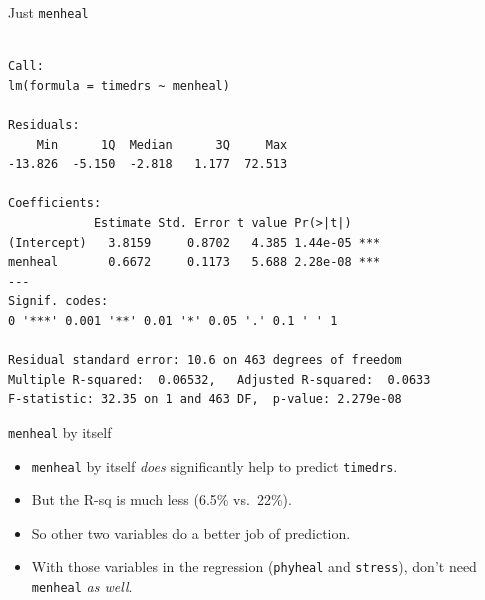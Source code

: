 \begin{frame}[fragile]{Just \texttt{menheal}}

{\footnotesize 
 
\begin{knitrout}
\color{fgcolor}\begin{kframe}
\begin{alltt}
\hlkwb{=}\hlopt{~} 
\end{alltt}
\begin{verbatim}

Call:
lm(formula = timedrs ~ menheal)

Residuals:
    Min      1Q  Median      3Q     Max 
-13.826  -5.150  -2.818   1.177  72.513 

Coefficients:
            Estimate Std. Error t value Pr(>|t|)    
(Intercept)   3.8159     0.8702   4.385 1.44e-05 ***
menheal       0.6672     0.1173   5.688 2.28e-08 ***
---
Signif. codes:  
0 '***' 0.001 '**' 0.01 '*' 0.05 '.' 0.1 ' ' 1

Residual standard error: 10.6 on 463 degrees of freedom
Multiple R-squared:  0.06532,	Adjusted R-squared:  0.0633 
F-statistic: 32.35 on 1 and 463 DF,  p-value: 2.279e-08
\end{verbatim}
\end{kframe}
\end{knitrout}
}

\end{frame}

\begin{frame}[fragile]{\texttt{menheal} by itself}

  \begin{itemize}
  \item \verb-menheal- by itself {\em does} significantly help to predict \verb-timedrs-.
  \item But the R-sq is much less (6.5\% vs.\ 22\%).
  \item So other two variables do a better job of prediction.
  \item With those variables in the regression (\texttt{phyheal} and
    \texttt{stress}), don't need \texttt{menheal} \emph{as well}.

  \end{itemize}
  


  
\end{frame}






